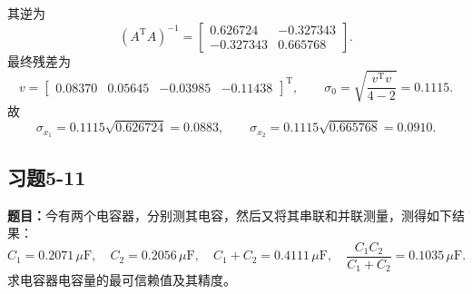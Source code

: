 \documentclass[UTF8,zihao=-4]{ctexart}
\newcommand{\problem}[1]{\subsection*{#1}}
\newcommand{\timu}{\noindent\textbf{题目：}}
\begin{document}
{\begin{equation*}
\end{equation*}
其逆为
\begin{equation*}
    (A^{\mathrm T}A)^{-1}=\begin{bmatrix}
        0.626724&-0.327343\\
        -0.327343&0.665768
    \end{bmatrix}.
\end{equation*}
最终残差为
\begin{equation*}
    v=\begin{bmatrix}0.08370&0.05645&-0.03985&-0.11438\end{bmatrix}^{\mathrm T},
    \qquad
    \sigma_0=\sqrt{\frac{v^{\mathrm T}v}{4-2}}=0.1115.
\end{equation*}
故
\begin{equation*}
    \sigma_{x_1}=0.1115\sqrt{0.626724}=0.0883,
    \qquad
    \sigma_{x_2}=0.1115\sqrt{0.665768}=0.0910.
\end{equation*}

\newpage

\problem{习题5-11}
\timu 今有两个电容器，分别测其电容，然后又将其串联和并联测量，测得如下结果：
\begin{equation*}
    C_1=0.2071\,\mu\mathrm{F},\quad
    C_2=0.2056\,\mu\mathrm{F},\quad
    C_1+C_2=0.4111\,\mu\mathrm{F},\quad
    \frac{C_1C_2}{C_1+C_2}=0.1035\,\mu\mathrm{F}.
\end{equation*}
求电容器电容量的最可信赖值及其精度。

}
\end{document}
